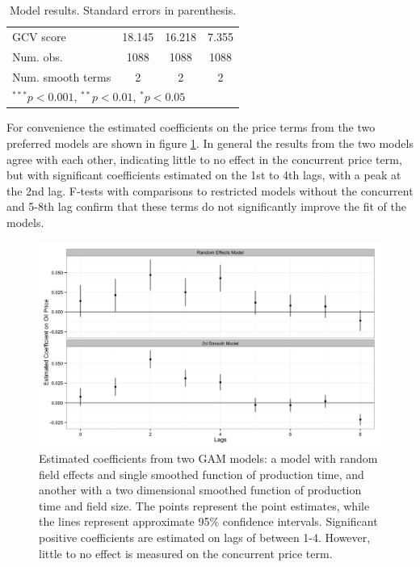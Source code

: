 \documentclass[11pt]{article}
\begin{document}
\begin{table}
\begin{center}
\begin{tabular}{l c c c }
GCV score                                    & 18.145         & 16.218         & 7.355            \\
Num. obs.                                    & 1088           & 1088           & 1088             \\
Num. smooth terms                            & 2              & 2              & 2                \\
\hline
\multicolumn{4}{l}{\scriptsize{$^{***}p<0.001$, $^{**}p<0.01$, $^*p<0.05$}}
\end{tabular}
\caption{Model results. Standard errors in parenthesis.}
\label{GAM_model_table}
\end{center}
\end{table}
 
For convenience the estimated coefficients on the price terms from the two preferred models are shown in figure \ref{price_coefficients}. In general the results from the two models agree with each other, indicating little to no effect in the concurrent price term, but with significant coefficients estimated on the 1st to 4th lags, with a peak at the 2nd lag.  F-tests with comparisons to restricted models without the concurrent and 5-8th lag confirm that these terms do not significantly improve the fit of the models.

\begin{figure}
	\includegraphics[width=1\textwidth]{figures/price_coefficents.png}
	\caption{Estimated coefficients from two GAM models: a model with random field effects and single smoothed function of production time, and another with a two dimensional smoothed function of production time and field size.  The points represent the point estimates, while the lines represent approximate 95\% confidence intervals. Significant positive coefficients are estimated on lags of between 1-4.  However, little to no effect is measured on the concurrent price term.}
	\label{price_coefficients}
\end{figure}
\end{document}
